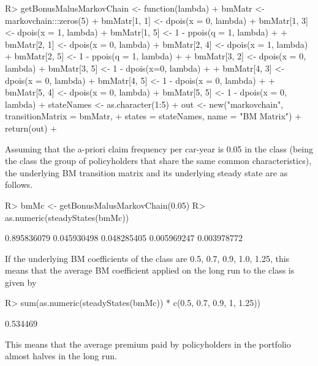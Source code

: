 \documentclass[
  nojss]{jss}
\begin{document}
\begin{CodeChunk}
\begin{CodeInput}
R> getBonusMalusMarkovChain <- function(lambda) {
+   bmMatr <- markovchain:::zeros(5)
+   bmMatr[1, 1] <- dpois(x = 0, lambda)
+   bmMatr[1, 3] <- dpois(x = 1, lambda)
+   bmMatr[1, 5] <- 1 - ppois(q = 1, lambda)
+   
+   bmMatr[2, 1] <- dpois(x = 0, lambda)
+   bmMatr[2, 4] <- dpois(x = 1, lambda)
+   bmMatr[2, 5] <- 1 - ppois(q = 1, lambda)
+   
+   bmMatr[3, 2] <- dpois(x = 0, lambda)
+   bmMatr[3, 5] <- 1 - dpois(x=0, lambda)
+  
+   bmMatr[4, 3] <- dpois(x = 0, lambda)
+   bmMatr[4, 5] <- 1 - dpois(x = 0, lambda)
+   
+   bmMatr[5, 4] <- dpois(x = 0, lambda)
+   bmMatr[5, 5] <- 1 - dpois(x = 0, lambda)
+   stateNames <- as.character(1:5)
+   out <- new("markovchain", transitionMatrix = bmMatr, 
+              states = stateNames, name = "BM Matrix")
+   return(out)
+ }
\end{CodeInput}
\end{CodeChunk}

Assuming that the a-priori claim frequency per car-year is 0.05 in the class (being the class the group of policyholders that share the same common characteristics), the underlying BM transition matrix and its underlying steady state are as follows.

\begin{CodeChunk}
\begin{CodeInput}
R> bmMc <- getBonusMalusMarkovChain(0.05)
R> as.numeric(steadyStates(bmMc))
\end{CodeInput}
\begin{CodeOutput}
[1] 0.895836079 0.045930498 0.048285405 0.005969247 0.003978772
\end{CodeOutput}
\end{CodeChunk}

If the underlying BM coefficients of the class are 0.5, 0.7, 0.9, 1.0, 1.25, this means that the average BM coefficient applied on the long run to the class is given by

\begin{CodeChunk}
\begin{CodeInput}
R> sum(as.numeric(steadyStates(bmMc)) * c(0.5, 0.7, 0.9, 1, 1.25))
\end{CodeInput}
\begin{CodeOutput}
[1] 0.534469
\end{CodeOutput}
\end{CodeChunk}

This means that the average premium paid by policyholders in the portfolio almost halves in the long run.
\end{document}
